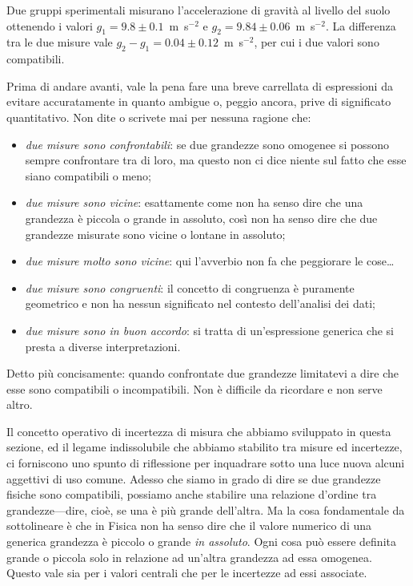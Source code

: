 \begin{examplebox}
  \begin{example}
    Due gruppi sperimentali misurano l'accelerazione di gravità al livello del
    suolo ottenendo i valori $g_1 = 9.8 \pm 0.1$~m~s$^{-2}$ e
    $g_2 = 9.84 \pm 0.06$~m~s$^{-2}$. La differenza tra le due misure vale
    $g_2 - g_1 = 0.04 \pm 0.12$~m~s$^{-2}$, per cui i due valori sono
    compatibili.
  \end{example}
\end{examplebox}

Prima di andare avanti, vale la pena fare una breve carrellata di espressioni
da evitare accuratamente in quanto ambigue o, peggio ancora, prive di
significato quantitativo. Non dite o scrivete mai per nessuna ragione che:
\begin{itemize}
\item \emph{due misure sono confrontabili}: se due grandezze sono omogenee si
  possono sempre confrontare tra di loro, ma questo non ci dice niente sul fatto
  che esse siano compatibili o meno;
\item \emph{due misure sono vicine}: esattamente come non ha senso dire che
  una grandezza è piccola o grande in assoluto, così non ha senso dire
  che due grandezze misurate sono vicine o lontane in assoluto;
\item \emph{due misure molto sono vicine}: qui l'avverbio non fa che
  peggiorare le cose\ldots
\item \emph{due misure sono congruenti}: il concetto di congruenza è
  puramente geometrico e non ha nessun significato nel contesto dell'analisi
  dei dati;
\item \emph{due misure sono in buon accordo}: si tratta di un'espressione
  generica che si presta a diverse interpretazioni.
\end{itemize}
Detto più concisamente: quando confrontate due grandezze limitatevi a dire
che esse sono compatibili o incompatibili. Non è difficile da ricordare e non
serve altro.

Il concetto operativo di incertezza di misura che abbiamo sviluppato in questa
sezione, ed il legame indissolubile che abbiamo stabilito tra misure ed
incertezze, ci forniscono uno spunto di riflessione per inquadrare sotto una
luce nuova alcuni aggettivi di uso comune. Adesso che siamo in grado di dire
se due grandezze fisiche sono compatibili, possiamo anche stabilire una
relazione d'ordine tra grandezze---dire, cioè, se una è più grande
dell'altra. Ma la cosa fondamentale da sottolineare è che in Fisica non ha
senso dire che il valore numerico di una generica grandezza è piccolo o grande
\emph{in assoluto}. Ogni cosa può essere definita grande o piccola solo in
relazione ad un'altra grandezza ad essa omogenea. Questo vale sia per i valori
centrali che per le incertezze ad essi associate.

